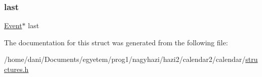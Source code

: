 \mbox{\label{struct_event_list_a8e52f53a3606d45d86182ce606e9369d}} 
\subsubsection{\texorpdfstring{last}{last}}
{\footnotesize\ttfamily \hyperlink{struct_event}{Event}$\ast$ last}



The documentation for this struct was generated from the following file\+:\begin{DoxyCompactItemize}
\item 
/home/dani/\+Documents/egyetem/prog1/nagyhazi/hazi2/calendar2/calendar/\hyperlink{structures_8h}{structures.\+h}\end{DoxyCompactItemize}
